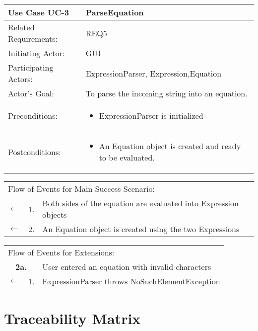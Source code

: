 \documentclass[11pt]{article}
\begin{document}
\newpage
\begin{center}
\begin{tabular}{p{1.5in}p{5in}}
\hline
\textbf{Use Case UC-3}     & \textbf{ParseEquation} \\ \hline
Related Requirements: & REQ5 \\
Initiating Actor:     & GUI \\
Participating Actors: & ExpressionParser, Expression,Equation \\
Actor's Goal:          & To parse the incoming string into an equation. \\
Preconditions:         & \begin{itemize}[nosep]
		      \item  ExpressionParser is initialized
                         \end{itemize} \\
Postconditions:        & \begin{itemize}[nosep]
                         \item An Equation object is created and ready to be evaluated.
                         \end{itemize} \\ \hline
\end{tabular}

\begin{tabular}{p{.25in}p{.25in}p{5.8in}}
\multicolumn{3}{l}{Flow of Events for Main Success Scenario:} \\
$\leftarrow$  & 1. & Both sides of the equation are evaluated into Expression objects\\
$\leftarrow$  & 2. & An Equation object is created using the two Expressions\\
\end{tabular}

\begin{tabular}{p{.25in}p{.25in}p{5.8in}}
\multicolumn{3}{l}{Flow of Events for Extensions:} \\
\multicolumn{2}{c}{\textbf{2a.}} & User entered an equation with invalid characters \\
$\leftarrow$  & 1.           & ExpressionParser throws NoSuchElementException\\


\end{tabular}
\end{center}



\newpage

\section{Traceability Matrix}
\end{document}
